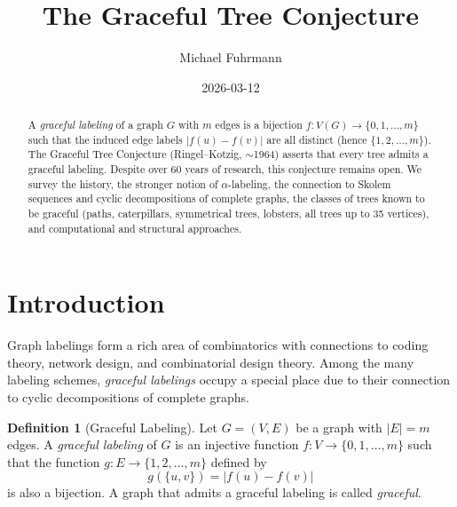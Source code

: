 \documentclass[12pt,a4paper]{amsart}
\theoremstyle{definition}
\newtheorem{definition}[theorem]{Definition}
\theoremstyle{remark}
\begin{document}
\begin{abstract}
A \emph{graceful labeling} of a graph $G$ with $m$ edges is a bijection
$f: V(G) \to \{0, 1, \ldots, m\}$ such that the induced edge labels
$|f(u) - f(v)|$ are all distinct (hence $\{1, 2, \ldots, m\}$). The
Graceful Tree Conjecture (Ringel--Kotzig, $\sim$1964) asserts that every tree
admits a graceful labeling. Despite over 60 years of research, this conjecture
remains open. We survey the history, the stronger notion of $\alpha$-labeling,
the connection to Skolem sequences and cyclic decompositions of complete graphs,
the classes of trees known to be graceful (paths, caterpillars, symmetrical trees,
lobsters, all trees up to 35 vertices), and computational and structural approaches.
\end{abstract}

\title{The Graceful Tree Conjecture}

\author{Michael Fuhrmann}
\address{Specialist Mathematics Project, Build 164}
\date{2026-03-12}

\maketitle

\tableofcontents

\section{Introduction}

Graph labelings form a rich area of combinatorics with connections to coding theory,
network design, and combinatorial design theory. Among the many labeling schemes,
\emph{graceful labelings} occupy a special place due to their connection to cyclic
decompositions of complete graphs.

\begin{definition}[Graceful Labeling]\label{def:graceful}
Let $G = (V, E)$ be a graph with $|E| = m$ edges. A \emph{graceful labeling} of
$G$ is an injective function $f: V \to \{0, 1, \ldots, m\}$ such that the
function $g: E \to \{1, 2, \ldots, m\}$ defined by
\[
  g(\{u,v\}) = |f(u) - f(v)|
\]
is also a bijection. A graph that admits a graceful labeling is called
\emph{graceful}.
\end{definition}
\end{document}
